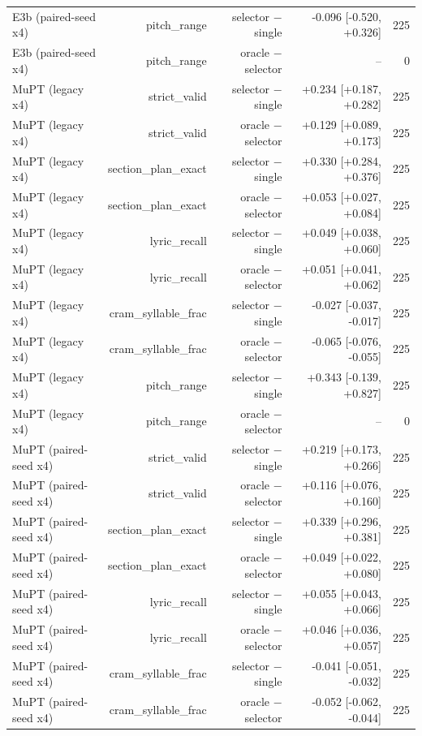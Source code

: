\begin{table}[t]
\begin{tabular}{lrrrr}
E3b (paired-seed x4) & pitch\_range & selector $-$ single & -0.096 [-0.520, +0.326] & 225 \\
E3b (paired-seed x4) & pitch\_range & oracle $-$ selector & – & 0 \\
MuPT (legacy x4) & strict\_valid & selector $-$ single & +0.234 [+0.187, +0.282] & 225 \\
MuPT (legacy x4) & strict\_valid & oracle $-$ selector & +0.129 [+0.089, +0.173] & 225 \\
MuPT (legacy x4) & section\_plan\_exact & selector $-$ single & +0.330 [+0.284, +0.376] & 225 \\
MuPT (legacy x4) & section\_plan\_exact & oracle $-$ selector & +0.053 [+0.027, +0.084] & 225 \\
MuPT (legacy x4) & lyric\_recall & selector $-$ single & +0.049 [+0.038, +0.060] & 225 \\
MuPT (legacy x4) & lyric\_recall & oracle $-$ selector & +0.051 [+0.041, +0.062] & 225 \\
MuPT (legacy x4) & cram\_syllable\_frac & selector $-$ single & -0.027 [-0.037, -0.017] & 225 \\
MuPT (legacy x4) & cram\_syllable\_frac & oracle $-$ selector & -0.065 [-0.076, -0.055] & 225 \\
MuPT (legacy x4) & pitch\_range & selector $-$ single & +0.343 [-0.139, +0.827] & 225 \\
MuPT (legacy x4) & pitch\_range & oracle $-$ selector & – & 0 \\
MuPT (paired-seed x4) & strict\_valid & selector $-$ single & +0.219 [+0.173, +0.266] & 225 \\
MuPT (paired-seed x4) & strict\_valid & oracle $-$ selector & +0.116 [+0.076, +0.160] & 225 \\
MuPT (paired-seed x4) & section\_plan\_exact & selector $-$ single & +0.339 [+0.296, +0.381] & 225 \\
MuPT (paired-seed x4) & section\_plan\_exact & oracle $-$ selector & +0.049 [+0.022, +0.080] & 225 \\
MuPT (paired-seed x4) & lyric\_recall & selector $-$ single & +0.055 [+0.043, +0.066] & 225 \\
MuPT (paired-seed x4) & lyric\_recall & oracle $-$ selector & +0.046 [+0.036, +0.057] & 225 \\
MuPT (paired-seed x4) & cram\_syllable\_frac & selector $-$ single & -0.041 [-0.051, -0.032] & 225 \\
MuPT (paired-seed x4) & cram\_syllable\_frac & oracle $-$ selector & -0.052 [-0.062, -0.044] & 225 \\

\end{tabular}
\end{table}
